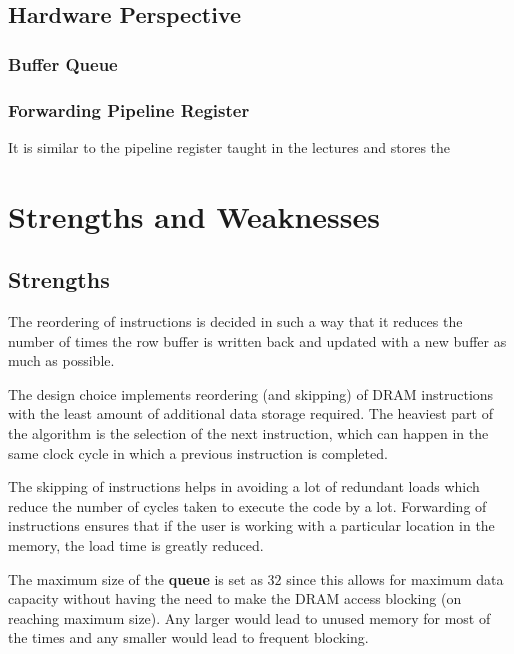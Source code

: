 \documentclass{article}
\begin{document}
\subsection{Hardware Perspective}
\subsubsection*{Buffer Queue}

\subsubsection*{Forwarding Pipeline Register}
It is similar to the pipeline register taught in the lectures and stores the 


\section{Strengths and Weaknesses}


\subsection{Strengths}
The reordering of instructions is decided in such a way that it reduces the number of times the row buffer is written back and updated with a new buffer as much as possible.\par
The design choice implements reordering (and skipping) of DRAM instructions with the least amount of additional data storage required. The heaviest part of the algorithm is the selection of the next instruction, which can happen in the same clock cycle in which a previous instruction is completed.\par
The skipping of instructions helps in avoiding a lot of redundant loads which reduce the number of cycles taken to execute the code by a lot. Forwarding of instructions ensures that if the user is working with a particular location in the memory, the load time is greatly reduced.\par
The maximum size of the \textbf{queue} is set as $32$ since this allows for maximum data capacity without having the need to make the DRAM access blocking (on reaching maximum size). Any larger would lead to unused memory for most of the times and any smaller would lead to frequent blocking.
\end{document}
